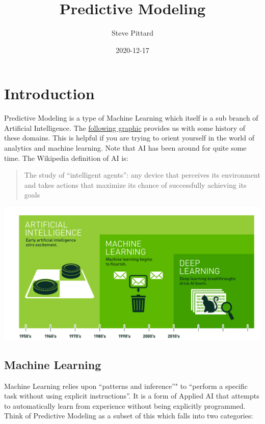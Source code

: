 \documentclass[
]{book}
\title{Predictive Modeling}
\author{Steve Pittard}
\date{2020-12-17}
\begin{document}
\maketitle

{
\setcounter{tocdepth}{1}
\tableofcontents
}
\hypertarget{intro}{%
\chapter{Introduction}\label{intro}}

Predictive Modeling is a type of Machine Learning which itself is a sub branch of Artificial Intelligence. The \href{https://blogs.nvidia.com/blog/2016/07/29/whats-difference-artificial-intelligence-machine-learning-deep-learning-ai/}{following graphic} provides us with some history of these domains. This is helpful if you are trying to orient yourself in the world of analytics and machine learning. Note that AI has been around for quite some time. The Wikipedia definition of AI is:

\begin{quote}
The study of ``intelligent agents'': any device that perceives its environment and takes
actions that maximize its chance of successfully achieving its goals
\end{quote}

\includegraphics{./PICS/histofai.png}

\hypertarget{machine-learning}{%
\section{Machine Learning}\label{machine-learning}}

Machine Learning relies upon ``patterns and inference''" to ``perform a specific task without using explicit instructions''. It is a form of Applied AI that attempts to automatically learn from experience without being explicitly programmed. Think of Predictive Modeling as a subset of this which falls into two categories:
\end{document}
